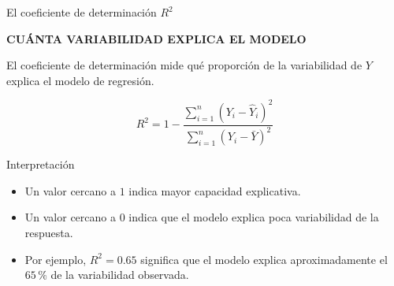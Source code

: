 \documentclass[aspectratio=169,11pt]{beamer}
\newcommand{\kicker}[1]{%
  {\scriptsize\bfseries\color{cAcc}\MakeUppercase{#1}}%
  \par\vspace{0.2em}%
}
\newenvironment{cerrado}[1]
  {\begin{block}{#1}
   \begin{minipage}{\linewidth}
   \raggedright}
  {\end{minipage}
   \end{block}}
\begin{document}
\begin{frame}{El coeficiente de determinación \(R^2\)}

  \begin{center}
    \begin{minipage}{0.84\textwidth}

      \kicker{CUÁNTA VARIABILIDAD EXPLICA EL MODELO}

      El coeficiente de determinación mide qué proporción de la
      variabilidad de \(Y\) explica el modelo de regresión.

      \[
        R^2
        =
        1-
        \frac{\sum_{i=1}^{n}(Y_i-\hat{Y}_i)^2}
        {\sum_{i=1}^{n}(Y_i-\bar{Y})^2}
      \]

      \begin{cerrado}{Interpretación}

        \begin{itemize}
          \setlength{\itemsep}{0.25em}

          \item Un valor cercano a \(1\) indica mayor capacidad explicativa.

          \item Un valor cercano a \(0\) indica que el modelo explica
          poca variabilidad de la respuesta.

          \item Por ejemplo, \(R^2=0.65\) significa que el modelo explica
          aproximadamente el \(65\,\%\) de la variabilidad observada.

        \end{itemize}

      \end{cerrado}

    \end{minipage}
  \end{center}

\end{frame}
\end{document}
